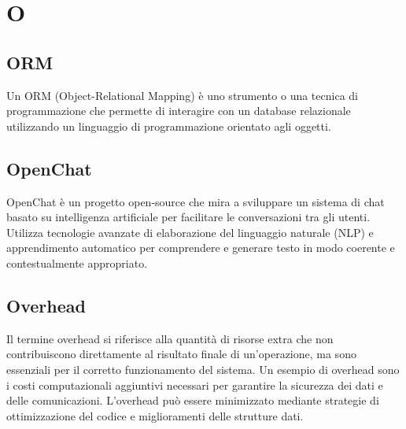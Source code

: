 \section{O}

\vspace{2em}
\subsection*{ORM}
\par Un ORM (Object-Relational Mapping) è uno strumento o una tecnica di programmazione che permette di interagire con un database relazionale utilizzando un linguaggio di programmazione orientato agli oggetti.

\vspace{2em}
\subsection*{OpenChat}
\par OpenChat è un progetto open-source che mira a sviluppare un sistema di chat basato su intelligenza artificiale per facilitare le conversazioni tra gli utenti. Utilizza tecnologie avanzate di elaborazione del linguaggio naturale (NLP) e apprendimento automatico per comprendere e generare testo in modo coerente e contestualmente appropriato.

\vspace{2em}
\subsection*{Overhead}
\par Il termine overhead si riferisce alla quantità di risorse extra che non contribuiscono direttamente al risultato finale di un'operazione, ma sono essenziali per il corretto funzionamento del sistema. Un esempio di overhead sono i costi computazionali aggiuntivi necessari per garantire la sicurezza dei dati e delle comunicazioni. L'overhead può essere minimizzato mediante strategie di ottimizzazione del codice e miglioramenti delle strutture dati.
